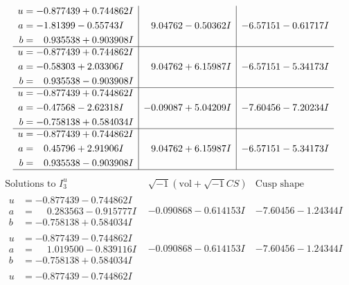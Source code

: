 \documentclass[1p]{elsarticle_modified}
\theoremstyle{definition}
\newcommand{\I}{\sqrt{-1}}
\begin{document}
$$\begin{array}{c|c|c}
\begin{aligned}
u &= -0.877439 + 0.744862 I \\
a &= -1.81399 - 0.55743 I \\
b &= \phantom{-}0.935538 + 0.903908 I\end{aligned}
 & \phantom{-}9.04762 - 0.50362 I & -6.57151 - 0.61717 I \\ \hline\begin{aligned}
u &= -0.877439 + 0.744862 I \\
a &= -0.58303 + 2.03306 I \\
b &= \phantom{-}0.935538 - 0.903908 I\end{aligned}
 & \phantom{-}9.04762 + 6.15987 I & -6.57151 - 5.34173 I \\ \hline\begin{aligned}
u &= -0.877439 + 0.744862 I \\
a &= -0.47568 - 2.62318 I \\
b &= -0.758138 + 0.584034 I\end{aligned}
 & -0.09087 + 5.04209 I & -7.60456 - 7.20234 I \\ \hline\begin{aligned}
u &= -0.877439 + 0.744862 I \\
a &= \phantom{-}0.45796 + 2.91906 I \\
b &= \phantom{-}0.935538 - 0.903908 I\end{aligned}
 & \phantom{-}9.04762 + 6.15987 I & -6.57151 - 5.34173 I\\
 \hline 
 \end{array}$$\newpage$$\begin{array}{c|c|c}  
\text{Solutions to }I^u_{3}& \I (\text{vol} + \sqrt{-1}CS) & \text{Cusp shape}\\
 \hline 
\begin{aligned}
u &= -0.877439 - 0.744862 I \\
a &= \phantom{-}0.283563 - 0.915777 I \\
b &= -0.758138 + 0.584034 I\end{aligned}
 & -0.090868 - 0.614153 I & -7.60456 - 1.24344 I \\ \hline\begin{aligned}
u &= -0.877439 - 0.744862 I \\
a &= \phantom{-}1.019500 - 0.839116 I \\
b &= -0.758138 + 0.584034 I\end{aligned}
 & -0.090868 - 0.614153 I & -7.60456 - 1.24344 I \\ \hline\begin{aligned}
u &= -0.877439 - 0.744862 I \\

\end{aligned}
\end{array}$$
\end{document}
